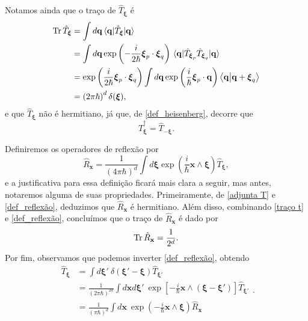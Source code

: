 \documentclass[
	12pt,
	oneside,			%
	a4paper,			%
	english,			%
	brazil				%
	]{abntex2}
\theoremstyle{definition}
\begin{document}
Notamos ainda que o traço de $\hat{T}_{\boldsymbol{\xi}}$ é
\begin{equation}
\label{traço t}
    \begin{aligned}
        \Tr \hat{T}_{\boldsymbol{\xi}} &= \int d\mathbf{q} \ev{\hat{T}_{\boldsymbol{\xi}}}{\mathbf{q}} \\ &=  \int d\mathbf{q} \exp\left(- \frac{i}{2\hbar}\boldsymbol{\xi}_p \cdot\boldsymbol{\xi}_q\right) \ev{\hat{T}_{\boldsymbol{\xi}_p} \hat{T}_{\boldsymbol{\xi}_q} }{\mathbf{q}}
        \\ &=  \exp\left(\frac{i}{2\hbar} \boldsymbol{\xi}_p \cdot\boldsymbol{\xi}_q \right)\int d\mathbf{q} \exp\left(\frac{i}{\hbar}\boldsymbol{\xi}_p\cdot \mathbf{q} \right) \innerproduct{\mathbf{q}}{\mathbf{q}+\boldsymbol{\xi}_q} \\
        &= \left(2\pi \hbar\right)^d \delta(\boldsymbol{\xi}),
    \end{aligned}
\end{equation}
e que $\hat{T}_{\boldsymbol{\xi}}$ não é hermitiano, já que, de \eqref{def_heisenberg}, decorre que
\begin{equation}
\label{adjunta T}
    \hat{T}_{\boldsymbol{\xi}}^\dagger = \hat{T}_{\boldsymbol{-\xi}}.
\end{equation}

Definiremos os operadores de reflexão por
\begin{equation}
    \label{def_reflexão}
    \hat{R}_\mathbf{x} = \frac{1}{\left(4\pi \hbar \right)^d} \int d \boldsymbol{\xi} \exp \left( \frac{i}{\hbar} \mathbf{x} \wedge \boldsymbol{\xi} \right) \hat{T}_{\boldsymbol{\xi}},
\end{equation}
e a justificativa para essa definição ficará mais clara a seguir, mas antes, notaremos alguma de suas propriedades. Primeiramente, de \eqref{adjunta T} e \eqref{def_reflexão}, deduzimos que $\hat{R}_\mathbf{x}$ é hermitiano. Além disso, combinando \eqref{traço t} e \eqref{def_reflexão}, concluímos que o traço de $\hat{R}_\mathbf{x}$ é dado por
\begin{equation}
    \Tr \hat{R}_\mathbf{x} = \frac{1}{2^d}.
\end{equation}
Por fim, observamos que podemos inverter \eqref{def_reflexão}, obtendo
\begin{equation}
    \label{inversão}
    \begin{aligned}
        \hat{T}_{\boldsymbol{\xi}} &= \int d \boldsymbol{\xi}' \ \delta\left(\boldsymbol{\xi}' - \boldsymbol{\xi}\right) \hat{T}_{\boldsymbol{\xi}'} \\
        &= \frac{1}{\left(2\pi \hbar\right)^{2d}} \int d\mathbf{x}d \boldsymbol{\xi}' \ \exp \left[-\frac{i}{\hbar} \mathbf{x} \wedge \left(\boldsymbol{\xi} - \boldsymbol{\xi} '\right)\right] \hat{T}_{\boldsymbol{\xi}'} \\
        &= \frac{1}{\left(\pi \hbar\right)^d} \int d\mathbf{x} \ \exp \left(-\frac{i}{\hbar} \mathbf{x} \wedge \boldsymbol{\xi} \right) \hat{R}_\mathbf{x}
    \end{aligned}.
\end{equation}
\end{document}
